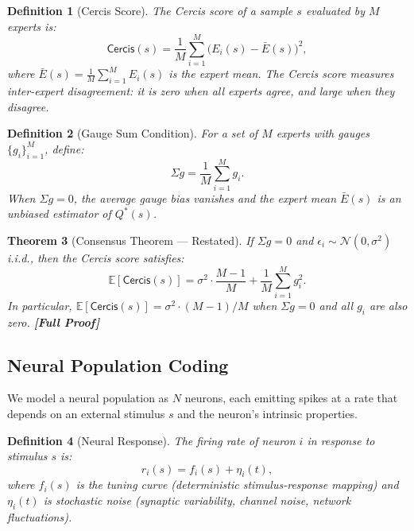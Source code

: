 \documentclass[12pt,a4paper]{article}
\newtheorem{theorem}{Theorem}[section]
\newtheorem{definition}[theorem]{Definition}
\theoremstyle{remark}
\newcommand{\E}{\mathbb{E}}
\newcommand{\Cercis}{\textsf{Cercis}}
\newcommand{\rigorFull}{\textbf{[Full Proof]}}
\begin{document}
\begin{definition}[Cercis Score]\label{def:cercis}
The \Cercis{} score of a sample $s$ evaluated by $M$ experts is:
\begin{equation}\label{eq:cercis-def}
    \Cercis(s) = \frac{1}{M} \sum_{i=1}^{M} \big(E_i(s) - \bar{E}(s)\big)^2,
\end{equation}
where $\bar{E}(s) = \frac{1}{M}\sum_{i=1}^{M} E_i(s)$ is the expert mean.
The \Cercis{} score measures inter-expert disagreement: it is zero when all
experts agree, and large when they disagree.
\end{definition}

\begin{definition}[Gauge Sum Condition]\label{def:sigma-g}
For a set of $M$ experts with gauges $\{g_i\}_{i=1}^{M}$, define:
\begin{equation}\label{eq:sigma-g-def}
    \Sigma g = \frac{1}{M}\sum_{i=1}^{M} g_i.
\end{equation}
When $\Sigma g = 0$, the average gauge bias vanishes and the expert mean
$\bar{E}(s)$ is an unbiased estimator of $Q^*(s)$.
\end{definition}

\begin{theorem}[Consensus Theorem — Restated]\label{thm:consensus}
If $\Sigma g = 0$ and $\epsilon_i \sim \mathcal{N}(0, \sigma^2)$ i.i.d.,
then the \Cercis{} score satisfies:
\begin{equation}\label{eq:consensus-cercis}
    \E[\Cercis(s)] = \sigma^2 \cdot \frac{M-1}{M} + \frac{1}{M}\sum_{i=1}^{M} g_i^2.
\end{equation}
In particular, $\E[\Cercis(s)] = \sigma^2 \cdot (M-1)/M$ when $\Sigma g = 0$
and all $g_i$ are also zero. \rigorFull
\end{theorem}

\subsection{Neural Population Coding}

We model a neural population as $N$ neurons, each emitting spikes at a rate
that depends on an external stimulus $s$ and the neuron's intrinsic properties.

\begin{definition}[Neural Response]\label{def:neural-response}
The firing rate of neuron $i$ in response to stimulus $s$ is:
\begin{equation}\label{eq:neural-rate}
    r_i(s) = f_i(s) + \eta_i(t),
\end{equation}
where $f_i(s)$ is the tuning curve (deterministic stimulus-response mapping)
and $\eta_i(t)$ is stochastic noise (synaptic variability, channel noise,
network fluctuations).
\end{definition}
\end{document}
